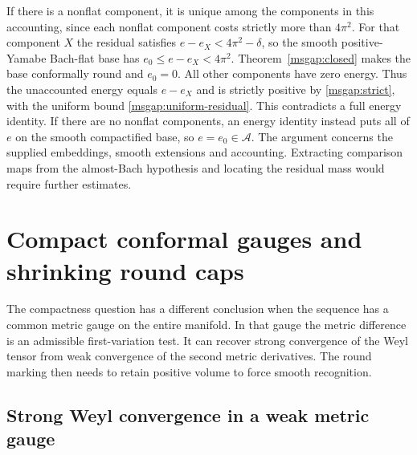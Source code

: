 \documentclass[11pt]{article}
\numberwithin{equation}{section}
\theoremstyle{definition}
\theoremstyle{remark}
\begin{document}
If there is a nonflat component, it is unique among the components
in this accounting, since each nonflat component costs strictly more
than \(4\pi^2\). For that component \(X\) the residual satisfies
\(e-e_X<4\pi^2-\delta\), so the smooth positive-Yamabe Bach-flat base
has \(e_0\le e-e_X<4\pi^2\). Theorem~\ref{msgap:closed} makes
the base conformally round and \(e_0=0\). All other components
have zero energy. Thus the unaccounted energy equals \(e-e_X\)
and is strictly positive by \eqref{msgap:strict}, with the
uniform bound \eqref{msgap:uniform-residual}. This contradicts a
full energy identity. If there are no nonflat components, an energy
identity instead puts all of \(e\) on the smooth compactified base,
so \(e=e_0\in\mathcal A\). The argument concerns the supplied
embeddings, smooth extensions and accounting. Extracting comparison
maps from the almost-Bach hypothesis and locating the residual mass
would require further estimates.

\section{Compact conformal gauges and shrinking round caps}
\label{msgauge:section}

The compactness question has a different conclusion when the sequence
has a common metric gauge on the entire manifold. In that gauge the
metric difference is an admissible first-variation test. It can recover
strong convergence of the Weyl tensor from weak convergence of the
second metric derivatives. The round marking then needs to retain
positive volume to force smooth recognition.

\subsection{Strong Weyl convergence in a weak metric gauge}
\end{document}

